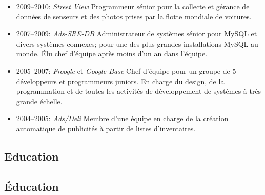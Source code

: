 \begin{langfr}
\begin{itemize}%
\vspace{2 mm}
\item 2009--2010: \textit{Street View} Programmeur s\'{e}nior pour la collecte et g\'{e}rance de donn\'{e}es de senseurs et des photos prises par la flotte mondiale de voitures.
\item 2007--2009: \textit{Ads-SRE-DB} Administrateur de syst\`{e}mes s\'{e}nior pour MySQL et divers syst\`{e}mes connexes; pour une des plus grandes installations MySQL au monde. \'{E}lu chef d'\'{e}quipe apr\`{e}s moins d'un an dans l'\'{e}quipe.
\item 2005--2007: \textit{Froogle} et \textit{Google Base} Chef d'\'{e}quipe pour un groupe de 5 d\'{e}veloppeurs et programmeurs juniors. En charge du design, de la programmation et de toutes les activit\'{e}s de d\'{e}veloppement de syst\`{e}mes \`{a} tr\`{e}s grande \'{e}chelle.
\item 2004--2005: \textit{Ads/Deli} Membre d'une \'{e}quipe en charge de la cr\'{e}ation automatique de publicit\'{e}s \`{a} partir de listes d'inventaires.
\end{itemize}
\end{langfr}

\begin{langen}
\section{Education}
\end{langen}
\begin{langfr}
\section{\'Education}
\end{langfr}

\begin{langen}
\end{langen}
\begin{langfr}
\end{langfr}


